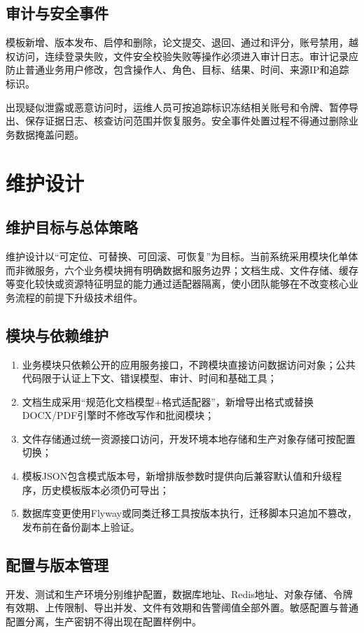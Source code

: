 \documentclass{../template/softeng}
\begin{document}
	\subsection{审计与安全事件}
	模板新增、版本发布、启停和删除，论文提交、退回、通过和评分，账号禁用，越权访问，连续登录失败，文件安全校验失败等操作必须进入审计日志。审计记录应防止普通业务用户修改，包含操作人、角色、目标、结果、时间、来源IP和追踪标识。
	
	出现疑似泄露或恶意访问时，运维人员可按追踪标识冻结相关账号和令牌、暂停导出、保存证据日志、核查访问范围并恢复服务。安全事件处置过程不得通过删除业务数据掩盖问题。
	
	\section{维护设计}
	
	\subsection{维护目标与总体策略}
	维护设计以“可定位、可替换、可回滚、可恢复”为目标。当前系统采用模块化单体而非微服务，六个业务模块拥有明确数据和服务边界；文档生成、文件存储、缓存等变化较快或资源特征明显的能力通过适配器隔离，使小团队能够在不改变核心业务流程的前提下升级技术组件。
	
	\subsection{模块与依赖维护}
	\begin{enumerate}
		\item 业务模块只依赖公开的应用服务接口，不跨模块直接访问数据访问对象；公共代码限于认证上下文、错误模型、审计、时间和基础工具；
		\item 文档生成采用“规范化文档模型+格式适配器”，新增导出格式或替换DOCX/PDF引擎时不修改写作和批阅模块；
		\item 文件存储通过统一资源接口访问，开发环境本地存储和生产对象存储可按配置切换；
		\item 模板JSON包含模式版本号，新增排版参数时提供向后兼容默认值和升级程序，历史模板版本必须仍可导出；
		\item 数据库变更使用Flyway或同类迁移工具按版本执行，迁移脚本只追加不篡改，发布前在备份副本上验证。
	\end{enumerate}
	
	\subsection{配置与版本管理}
	开发、测试和生产环境分别维护配置，数据库地址、Redis地址、对象存储、令牌有效期、上传限制、导出并发、文件有效期和告警阈值全部外置。敏感配置与普通配置分离，生产密钥不得出现在配置样例中。
	
\end{document}
